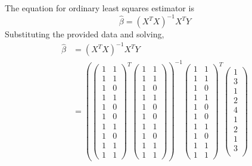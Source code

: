 \documentclass[12pt,twoside]{article}
\begin{document}
\begin{problems}
\begin{problemparts}
The equation for ordinary least squares estimator is
$$ \hat{\beta} = \left(X^T X\right)^{-1} X^T Y $$
Substituting the provided data and solving,
\begin{align*}
    \hat{\beta} &= \left(X^T X\right)^{-1} X^T Y \\
    &= \left(\begin{pmatrix}
    1 & 1 \\
    1 & 1 \\
    1 & 0 \\
    1 & 1 \\
    1 & 0 \\
    1 & 0 \\
    1 & 1 \\
    1 & 0 \\
    1 & 1 \\
    1 & 1 \end{pmatrix}^T \begin{pmatrix}
    1 & 1 \\
    1 & 1 \\
    1 & 0 \\
    1 & 1 \\
    1 & 0 \\
    1 & 0 \\
    1 & 1 \\
    1 & 0 \\
    1 & 1 \\
    1 & 1 \end{pmatrix}\right)^{-1} \begin{pmatrix}
    1 & 1 \\
    1 & 1 \\
    1 & 0 \\
    1 & 1 \\
    1 & 0 \\
    1 & 0 \\
    1 & 1 \\
    1 & 0 \\
    1 & 1 \\
    1 & 1 \end{pmatrix}^T \begin{pmatrix}
    1 \\
    3 \\
    1 \\
    2 \\
    4 \\
    1 \\
    2 \\
    1 \\
    3 \\

\end{pmatrix}
\end{align*}
\end{problemparts}
\end{problems}
\end{document}

